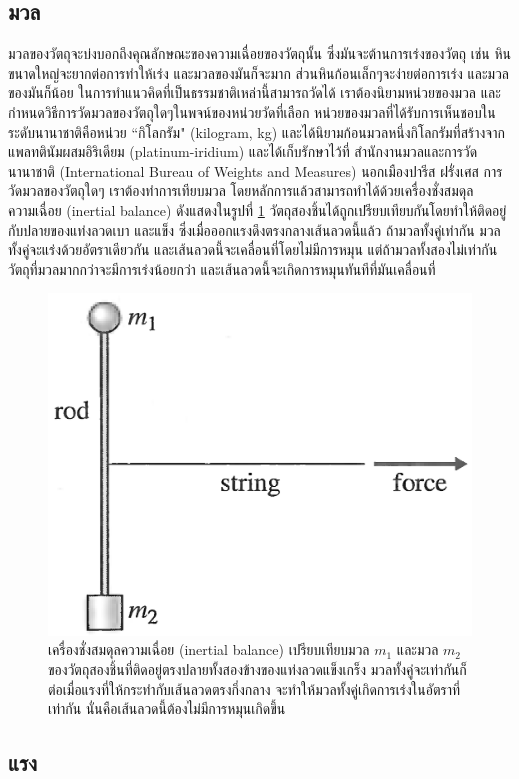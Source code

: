 \subsection{มวล}
\label{SubSec:Mass}

มวลของวัตถุจะบ่งบอกถึงคุณลักษณะของความเฉื่อยของวัตถุนั้น ซึ่งมันจะต้านการเร่งของวัตถุ เช่น หินขนาดใหญ่จะยากต่อการทำให้เร่ง และมวลของมันก็จะมาก ส่วนหินก้อนเล็กๆจะง่ายต่อการเร่ง และมวลของมันก็น้อย ในการทำแนวคิดที่เป็นธรรมชาติเหล่านี้สามารถวัดได้ เราต้องนิยามหน่วยของมวล และกำหนดวิธีการวัดมวลของวัตถุใดๆในพจน์ของหน่วยวัดที่เลือก หน่วยของมวลที่ได้รับการเห็นชอบในระดับนานาชาติคือหน่วย ``กิโลกรัม" (kilogram, kg) และได้นิยามก้อนมวลหนึ่งกิโลกรัมที่สร้างจากแพลทตินัมผสมอิริเดียม (platinum-iridium) และได้เก็บรักษาไว้ที่ สำนักงานมวลและการวัดนานาชาติ (International Bureau of Weights and Measures) นอกเมืองปารีส ฝรั่งเศส การวัดมวลของวัตถุใดๆ เราต้องทำการเทียบมวล โดยหลักการแล้วสามารถทำได้ด้วยเครื่องชั่งสมดุลความเฉื่อย (inertial balance) ดังแสดงในรูปที่ \ref{Fig2.2} วัตถุสองชิ้นได้ถูกเปรียบเทียบกันโดยทำให้ติดอยู่กับปลายของแท่งลวดเบา และแข็ง ซึ่งเมื่อออกแรงดึงตรงกลางเส้นลวดนี้แล้ว ถ้ามวลทั้งคู่เท่ากัน มวลทั้งคู่จะแร่งด้วยอัตราเดียวกัน และเส้นลวดนี้จะเคลื่อนที่โดยไม่มีการหมุน แต่ถ้ามวลทั้งสองไม่เท่ากัน วัตถุที่มวลมากกว่าจะมีการเร่งน้อยกว่า และเส้นลวดนี้จะเกิดการหมุนทันทีที่มันเคลื่อนที่

\begin{figure}[!h]%
\centering
\includegraphics[width=0.5\columnwidth]{Fig2.2.png}
\caption{เครื่องชั่งสมดุลความเฉื่อย (inertial balance) เปรียบเทียบมวล $m_1$ และมวล $m_2$ ของวัตถุสองชิ้นที่ติดอยู่ตรงปลายทั้งสองข้างของแท่งลวดแข็งเกร็ง มวลทั้งคู่จะเท่ากันก็ต่อเมื่อแรงที่ให้กระทำกับเส้นลวดตรงกึ่งกลาง จะทำให้มวลทั้งคู่เกิดการเร่งในอัตราที่เท่ากัน นั่นคือเส้นลวดนี้ต้องไม่มีการหมุนเกิดขึ้น}
\label{Fig2.2}
\end{figure}




\subsection{แรง}
\label{SubSec:Force}


